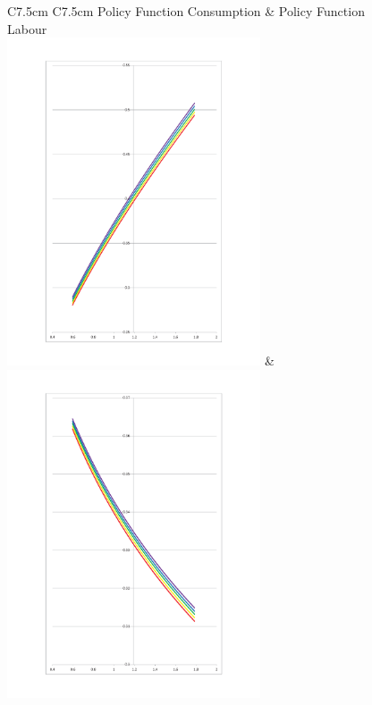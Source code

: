 \documentclass[a4paper,12pt]{article}
\begin{document}
\begin{figure}[htb]
\begin{tabular}{C{7.5cm} C{7.5cm}}
Policy Function Consumption & Policy Function Labour\\
\includegraphics[width=7.5cm]{abbildungen/consumption_curr} & \includegraphics[width=7.5cm]{abbildungen/labour_curr} \\
\end{tabular}
\label{Policy_curr}
\end{figure}
\end{document}
